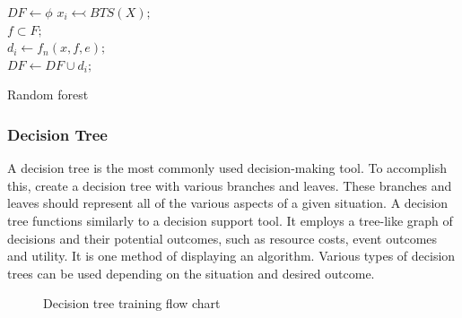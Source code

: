 \documentclass[conference]{IEEEtran}
\begin{document}
	\begin{algorithm}[!ht]
		\vspace{1em}
		
		\vspace{1em}
		
		{
			{
				$DF \leftarrow \phi$\;
			{
					$x_{i} \leftarrowtail BTS(X);$\\
					$f \subset F;$\\
					$d_{i} \leftarrow f_n{}(x,f,e);$\\
					$DF \leftarrow DF \cup d_{i};$\\
			}
		}
		}
		
		\label{Random Forest Algo}
		\vspace{1em}
		\caption{Random forest}%
	\end{algorithm}

	

	\subsubsection[H]{Decision Tree}		
	A decision tree is the most commonly used decision-making tool. To accomplish this, create a decision tree with various branches and leaves. These branches and leaves should represent all of the various aspects of a given situation\cite{C28}. A decision tree functions similarly to a decision support tool. It employs a tree-like graph of decisions and their potential outcomes, such as resource costs, event outcomes and utility. It is one method of displaying an algorithm\cite{C28}. Various types of decision trees can be used depending on the situation and desired outcome.\\	
	\begin{figure}[H]
		\caption[]{Decision tree training flow chart}
		\label{Tree Diagram}
	\end{figure}
	
\end{document}
